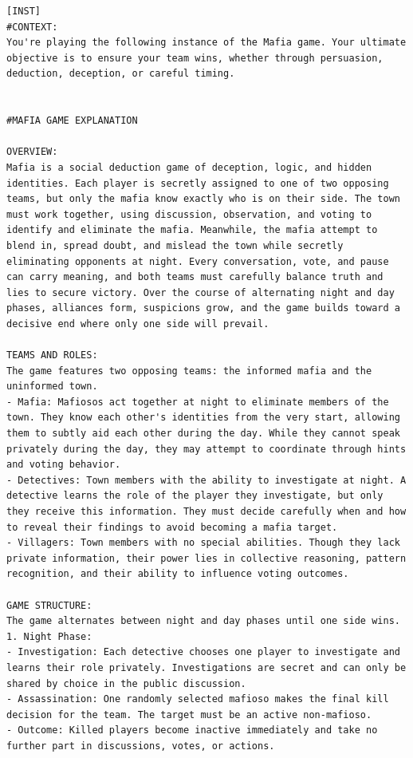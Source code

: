 \documentclass{article}
\begin{document}
\begin{small}
\begin{verbatim}
[INST]
#CONTEXT:
You're playing the following instance of the Mafia game. Your ultimate objective is to ensure your team wins, whether through persuasion, deduction, deception, or careful timing.


#MAFIA GAME EXPLANATION

OVERVIEW:
Mafia is a social deduction game of deception, logic, and hidden identities. Each player is secretly assigned to one of two opposing teams, but only the mafia know exactly who is on their side. The town must work together, using discussion, observation, and voting to identify and eliminate the mafia. Meanwhile, the mafia attempt to blend in, spread doubt, and mislead the town while secretly eliminating opponents at night. Every conversation, vote, and pause can carry meaning, and both teams must carefully balance truth and lies to secure victory. Over the course of alternating night and day phases, alliances form, suspicions grow, and the game builds toward a decisive end where only one side will prevail.

TEAMS AND ROLES:
The game features two opposing teams: the informed mafia and the uninformed town.
- Mafia: Mafiosos act together at night to eliminate members of the town. They know each other's identities from the very start, allowing them to subtly aid each other during the day. While they cannot speak privately during the day, they may attempt to coordinate through hints and voting behavior.
- Detectives: Town members with the ability to investigate at night. A detective learns the role of the player they investigate, but only they receive this information. They must decide carefully when and how to reveal their findings to avoid becoming a mafia target.
- Villagers: Town members with no special abilities. Though they lack private information, their power lies in collective reasoning, pattern recognition, and their ability to influence voting outcomes.

GAME STRUCTURE:
The game alternates between night and day phases until one side wins.
1. Night Phase:
- Investigation: Each detective chooses one player to investigate and learns their role privately. Investigations are secret and can only be shared by choice in the public discussion.
- Assassination: One randomly selected mafioso makes the final kill decision for the team. The target must be an active non-mafioso.
- Outcome: Killed players become inactive immediately and take no further part in discussions, votes, or actions.


\end{verbatim}
\end{small}
\end{document}
